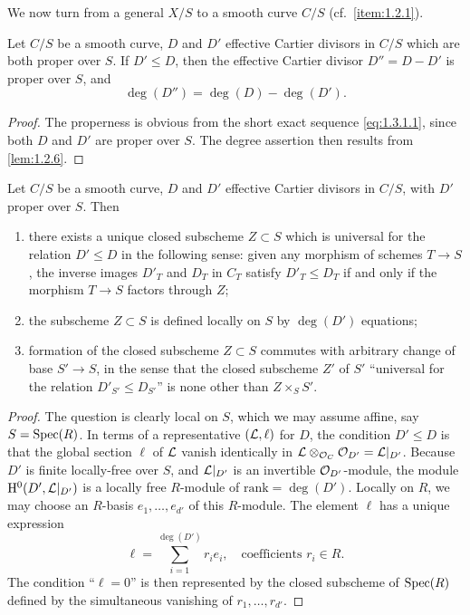 \kmitem\label{item:1.3.2}
We now turn from a general $X/S$ to a smooth curve $C/S$ (cf.~\ref{item:1.2.1}).

\begin{lemma}\label{lem:1.3.3}
Let $C/S$ be a smooth curve, $D$ and $D'$ effective Cartier divisors in $C/S$ which are both proper over $S$. If $D' \le D$, then the effective Cartier divisor $D'' = D - D'$ is proper over $S$, and
\[
\deg(D'') = \deg(D) - \deg(D').
\]
\end{lemma}

\begin{proof}
The properness is obvious from the short exact sequence \eqref{eq:1.3.1.1}, since both $D$ and $D'$ are proper over $S$. The degree assertion then results from \ref{lem:1.2.6}.
\end{proof}

\begin{keylemma}\label{lem:1.3.4}
Let $C/S$ be a smooth curve, $D$ and $D'$ effective Cartier divisors in $C/S$, with $D'$ proper over $S$. Then
\begin{enumerate}[(1)]
\item there exists a unique closed subscheme $Z \subset S$ which is universal for the relation $D' \le D$ in the following sense: given any morphism of schemes $T \to S$, the inverse images $D'_T$ and $D_T$ in $C_T$ satisfy $D'_T \le D_T$ if and only if the morphism $T \to S$ factors through $Z$;
\item the subscheme $Z \subset S$ is defined locally on $S$ by $\deg(D')$ equations;
\item formation of the closed subscheme $Z \subset S$ commutes with arbitrary change of base $S' \to S$, in the sense that the closed subscheme $Z'$ of $S'$ ``universal for the relation $D'_{S'} \le D_{S'}$'' is none other than $Z \times_S S'$.
\end{enumerate}
\end{keylemma}

\begin{proof}
The question is clearly local on $S$, which we may assume affine, say $S = \operatorname{Spec}(R)$. In terms of a representative $(\mathcal{L}, \ell)$ for $D$, the condition $D' \le D$ is that the global section $\ell$ of $\mathcal{L}$ vanish identically in $\mathcal{L} \otimes_{\mathcal{O}_C} \mathcal{O}_{D'} = \mathcal{L}|_{D'}$. Because $D'$ is finite locally-free over $S$, and $\mathcal{L}|_{D'}$ is an invertible $\mathcal{O}_{D'}$-module, the module $\mathrm{H}^0(D', \mathcal{L}|_{D'})$ is a locally free $R$-module of $\text{rank} = \deg(D')$. Locally on $R$, we may choose an $R$-basis $e_1, \dots, e_{d'}$ of this $R$-module. The element $\ell$ has a unique expression
\[
\ell = \sum_{i=1}^{\deg(D')} r_i e_i, \quad \text{coefficients } r_i \in R.
\]
The condition ``$\ell = 0$'' is then represented by the closed subscheme of $\operatorname{Spec}(R)$ defined by the simultaneous vanishing of $r_1, \dots, r_{d'}$.
\end{proof}

